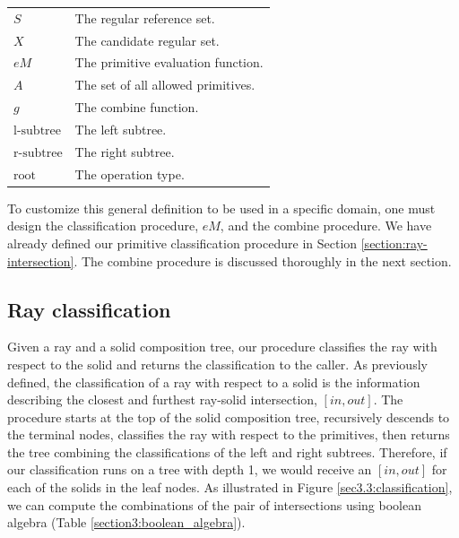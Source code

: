 \documentclass[a4paper,11pt,oneside]{article}
\makeatletter
\newenvironment{conditions}
  {\par\vspace{\abovedisplayskip}\noindent\begin{tabular}{>{$}l<{$} @{${}={}$} l}}
  {\end{tabular}\par\vspace{\belowdisplayskip}}
\makeatother
\begin{document}
\begin{conditions}
	S     				  &  The regular reference set. \\
	X     				  &  The candidate regular set. \\
	eM     	  &  The primitive evaluation function. \\
	A     			  	  &  The set of all allowed primitives. \\
	g     				  &  The combine function. \\
	\text{l-subtree}     &  The left subtree. \\
	\text{r-subtree}     &  The right subtree. \\
	\text{root}     	  &  The operation type. \footnotemark \\
\end{conditions}

To customize this general definition to be used in a specific domain, one must design the classification procedure, $eM$, and the combine procedure. We have already defined our primitive classification procedure in Section \ref{section:ray-intersection}. The combine procedure is discussed thoroughly in the next section.

\subsection{Ray classification}
\label{sec3.3:ray-classification}

Given a ray and a solid composition tree, our procedure classifies the ray with respect to the solid and returns the classification to the caller. As previously defined, the classification of a ray with respect to a solid is the information describing the closest and furthest ray-solid intersection, $[in, out]$. The procedure starts at the top of the solid composition tree, recursively descends to the terminal nodes, classifies the ray with respect to the primitives, then returns the tree combining the classifications of the left and right subtrees. Therefore, if our classification runs on a tree with depth 1, we would receive an $[in, out]$ for each of the solids in the leaf nodes. As illustrated in Figure \ref{sec3.3:classification}, we can compute the combinations of the pair of intersections using boolean algebra (Table \ref{section3:boolean_algebra}).
\end{document}
